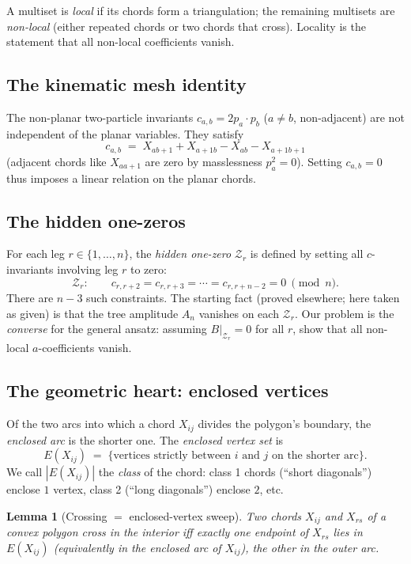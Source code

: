 \documentclass[11pt]{article}
\newcommand{\X}[2]{X_{#1#2}}
\newcommand{\Z}{\mathcal{Z}}
\newtheorem{lemma}{Lemma}
\theoremstyle{definition}
\begin{document}
A multiset is \emph{local} if its chords form a triangulation; the remaining
multisets are \emph{non-local} (either repeated chords or two chords that
cross). Locality is the statement that all non-local coefficients vanish.

\subsection{The kinematic mesh identity}

The non-planar two-particle invariants $c_{a,b}=2p_a\cdot p_b$ ($a\ne b$,
non-adjacent) are not independent of the planar variables. They satisfy
\[
\boxed{\ c_{a,b} \;=\; \X{a}{b+1} + \X{a+1}{b} - \X{a}{b} - \X{a+1}{b+1}\ }
\]
(adjacent chords like $\X{a}{a+1}$ are zero by masslessness $p_a^2=0$).
Setting $c_{a,b}=0$ thus imposes a linear relation on the planar chords.

\subsection{The hidden one-zeros}

For each leg $r\in\{1,\ldots,n\}$, the \emph{hidden one-zero} $\Z_r$ is
defined by setting all $c$-invariants involving leg $r$ to zero:
\[
\Z_r:\qquad c_{r,r+2}=c_{r,r+3}=\cdots=c_{r,r+n-2}=0\ \pmod n.
\]
There are $n-3$ such constraints. The starting fact (proved elsewhere; here
taken as given) is that the tree amplitude $A_n$ vanishes on each $\Z_r$.
Our problem is the \emph{converse} for the general ansatz: assuming
$B|_{\Z_r}=0$ for all $r$, show that all non-local $a$-coefficients vanish.

\subsection{The geometric heart: enclosed vertices}

Of the two arcs into which a chord $\X{i}{j}$ divides the polygon's
boundary, the \emph{enclosed arc} is the shorter one. The
\emph{enclosed vertex set} is
\[
E(\X{i}{j}) \;=\; \{\text{vertices strictly between $i$ and $j$ on the shorter arc}\}.
\]
We call $|E(\X{i}{j})|$ the \emph{class} of the chord:
class 1 chords (``short diagonals'') enclose $1$ vertex, class 2 (``long
diagonals'') enclose $2$, etc.

\begin{lemma}[Crossing $=$ enclosed-vertex sweep]
\label{lem:crossing}
Two chords $\X{i}{j}$ and $\X{r}{s}$ of a convex polygon cross in the
interior iff exactly one endpoint of $\X{r}{s}$ lies in $E(\X{i}{j})$
(equivalently in the enclosed arc of $\X{i}{j}$), the other in the outer arc.
\end{lemma}
\end{document}
